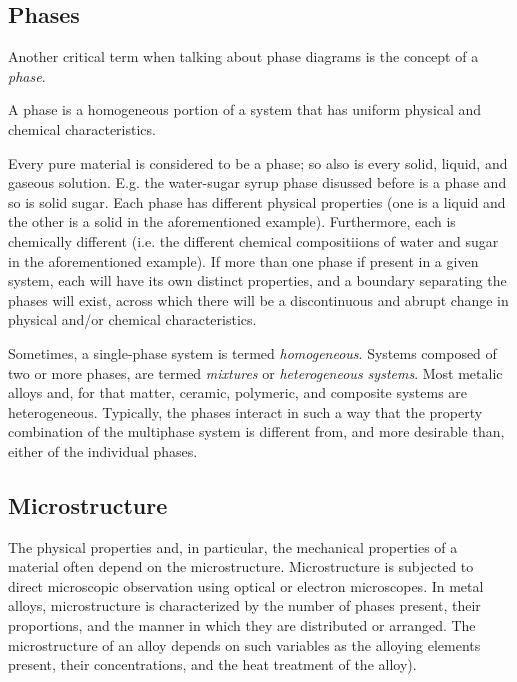 \subsection{Phases}
Another critical term when talking about phase diagrams is the concept of a \textit{phase}.
\begin{definition}[Phases]
  A phase is a homogeneous portion of a system that has uniform physical and chemical characteristics.
\end{definition}
 Every pure material is considered to be a phase; so also is every solid, liquid, and gaseous solution. E.g. the water-sugar syrup phase disussed before is a phase and so is solid sugar. Each phase has different physical properties (one is a liquid and the other is a solid in the aforementioned example). Furthermore, each is chemically different (i.e. the different chemical compositiions of water and sugar in the aforementioned example). If more than one phase if present in a given system, each will have its own distinct properties, and a boundary separating the phases will exist, across which there will be a discontinuous and abrupt change in physical and/or chemical characteristics.

Sometimes, a single-phase system is termed \textit{homogeneous}. Systems composed of two or more phases, are termed \textit{mixtures} or \textit{heterogeneous systems}. Most metalic alloys and, for that matter, ceramic, polymeric, and composite systems are heterogeneous. Typically, the phases interact in such a way that the property combination of the multiphase system is different from, and more desirable than, either of the individual phases.


\subsection{Microstructure}
The physical properties and, in particular, the mechanical properties of a material often depend on the microstructure. Microstructure is subjected to direct microscopic observation using optical or electron microscopes. In metal alloys, microstructure is characterized by the number of phases present, their proportions, and the manner in which they are distributed or arranged. The microstructure of an alloy depends on such variables as the alloying elements present, their concentrations, and the heat treatment of the alloy). 

